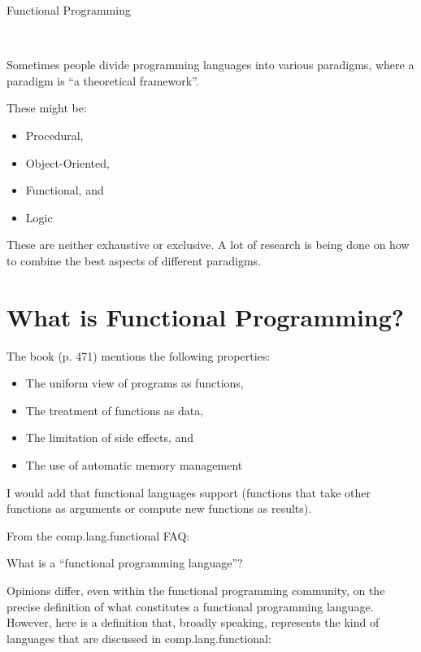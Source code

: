 \documentclass{seminar}
\begin{document}
\begin{slide}

\begin{center}
\begin{LARGE}
Functional Programming
\end{LARGE}\\[3ex]
\end{center}


Sometimes people divide programming languages into various paradigms,
where a paradigm is ``a theoretical framework''.

These might be:
\begin{itemize}
\item Procedural,
\item Object-Oriented,
\item Functional, and
\item Logic
\end{itemize}

These are neither exhaustive or exclusive.  A lot of research is being done
on how to combine the best aspects of different paradigms.

\newslide

\section*{What is Functional Programming?}

The book (p. 471) mentions the following properties:
\begin{itemize}
\item The uniform view of programs as functions,
\item The treatment of functions as data,
\item The limitation of side effects, and
\item The use of automatic memory management
\end{itemize}

I would add that functional languages support 
(functions that take other functions as arguments or compute new
functions as results).

\newslide

From the comp.lang.functional FAQ:

{\color{QuoteColor}
What is a ``functional programming language''?

Opinions differ, even within the functional programming community,
on the precise definition of what constitutes a functional programming
language. However, here is a definition that, broadly speaking,
represents the kind of languages that are discussed in
comp.lang.functional:

}
\end{slide}
\end{document}
